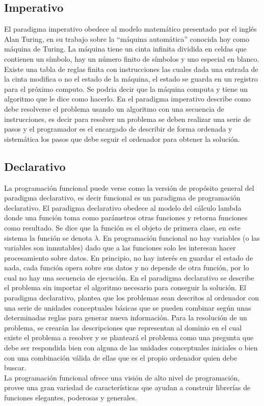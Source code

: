 \subsection{Imperativo}

El paradigma imperativo obedece al modelo matemático presentado por el inglés Alan Turing, en su trabajo sobre la “máquina automática” conocida hoy como máquina de Turing.
La máquina tiene un cinta infinita dividida en celdas que contienen un símbolo, hay un número finito de símbolos y uno especial en blanco. Existe una tabla de reglas finita con instrucciones las cuales dada una entrada de la cinta modifica o no el estado de la máquina, el estado se guarda en un registro para el próximo computo.
Se podria decir que la máquina computa y tiene un algoritmo que le dice como hacerlo.
En el paradigma imperativo describe como debe resolverse el problema usando un algoritmo con una secuencia de instrucciones, es decir para resolver un problema se deben realizar una serie de pasos y el programador es el encargado de describir de forma ordenada y sistemática los pasos que debe seguir el ordenador para obtener la solución.

\subsection{Declarativo}

La programación funcional puede verse como la versión de propósito general del paradigma declarativo, es decir funcional es un paradigma de programación declarativo.
El paradigma declarativo obedece al modelo del cálculo lambda donde una función toma como parámetros otras funciones y retorna funciones como resultado. Se dice que la función es el objeto de primera clase, en este sistema la función se denota $\lambda$.
En programación funcional no hay variables (o las variables son inmutables) dado que a las funciones solo les interesan hacer procesamiento sobre datos. En principio, no hay interés en guardar el estado de nada, cada función opera sobre sus datos y no depende de otra función, por lo cual no hay una secuencia de ejecución.
En el paradigma declarativo se describe el problema sin importar el algoritmo necesario para conseguir la solución.
El paradigma declarativo, plantea que los problemas sean descritos al ordenador con una serie de unidades conceptuales básicas que se pueden combinar según unas determinadas
reglas para generar nueva información. Para la resolución de un problema, se crearán las
descripciones que representan al dominio en el cual existe el problema a resolver y se planteará el problema como una pregunta que debe ser respondida bien con alguna de las unidades conceptuales iniciales o bien con una combinación válida de ellas que es el propio ordenador quien debe buscar.
\\
La programación funcional ofrece una visión de alto nivel de programación, provee una gran variedad de características que ayudan a construir librerías de funciones elegantes, poderosas y generales.\cite{Thompson2011}

